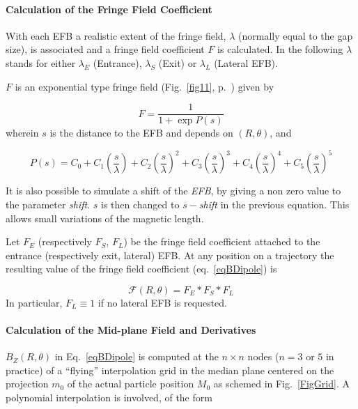 \paragraph{Calculation of the Fringe Field Coefficient} 

\noindent With  each EFB a realistic extent of the fringe field, $\lambda$ 
(normally equal to the gap size), is associated and a fringe field coefficient
$ F $ is calculated. In the following $\lambda$ stands for either $ \lambda_ E $
(Entrance), $ \lambda_ S $ (Exit) or $ \lambda_ L $ (Lateral EFB).  


\bigskip

\noindent$ F $ is an exponential type fringe field (Fig.~\ref{fig11}, p.~\pageref{fig11}) 
given by~\cite{Biblio12}     %

$$ F = \dfrac{1 }{ 1+ \exp P(s)} $$
%
 wherein $ s $ is the distance to the EFB and depends on $(R,\theta)$, and 

$$
    P(s) = C_0
       +C_1 \left(  \dfrac{s }{ \lambda} \right) 
       +C_2 \left( \dfrac{s }{ \lambda} \right)^2 
       + C_3 \left( \dfrac{s }{ \lambda} \right)^3 
       +C_4 \left( \dfrac{s }{ \lambda} \right)^4 
       + C_5 \left(\dfrac{s }{ \lambda} \right)^5 $$
       
\noindent It is also possible to simulate a shift of the \textsl{EFB}, by giving a non
zero value to the parameter \textsl{shift}.  $ s $ is then changed to $ s -$\textsl{shift} in the 
previous equation.   This allows small variations of the magnetic length.  
\bigskip

\noindent Let $ F_E $ (respectively $ F_S$, $F_L$)  be the fringe field
coefficient attached to the entrance (respectively exit, lateral) EFB. At any position on  a 
trajectory the resulting value of the fringe field coefficient (eq.~\ref{eqBDipole}) is

$$  \mathcal{F}(R,\theta) = F_E  \ast  F_S \ast   F_L $$
%
In particular, $F_L\equiv 1 $  if no lateral EFB is requested. 



\bigskip


\paragraph{Calculation of the  Mid-plane Field and Derivatives }

\noindent $ B_Z(R,\theta)$ in Eq.~\ref{eqBDipole} is 
computed at  the $n\times n$ nodes  ($n=3$ or $5$ in practice)  
of a ``flying'' interpolation grid in the median plane centered on the projection $m_0$ of 
the actual particle position $M_0$ as schemed 
in Fig.~\ref{FigGrid}. A polynomial interpolation is involved, of the form 

